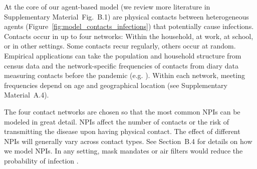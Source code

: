 \documentclass[12pt]{article}
\begin{document}
At the core of our agent-based model \cite{Aleta2020,Hinch2020} (we review more
literature in Supplementary Material~Fig.~B.1) are physical contacts
between heterogeneous agents (Figure~\ref{fig:model_contacts_infections}) that
potentially cause infections. Contacts occur in up to four networks: Within the
household, at work, at school, or in other settings. Some contacts recur regularly,
others occur at random. Empirical applications can take the population and household
structure from census data and the network-specific frequencies of contacts from diary
data measuring contacts before the pandemic (e.g. \cite{Mossong2008,Hoang2019}). Within
each network, meeting frequencies depend on age and geographical location (see
Supplementary Material~A.4).

The four contact networks are chosen so that the most common NPIs can be modeled in
great detail. NPIs affect the number of contacts or the risk of transmitting the disease
upon having physical contact. The effect of different NPIs will generally vary across
contact types. See Section~B.4 for details on how we model NPIs. In any
setting, mask mandates or air filters would reduce the probability of infection
\cite{Lessler2021, Cheng2021}.
\end{document}
